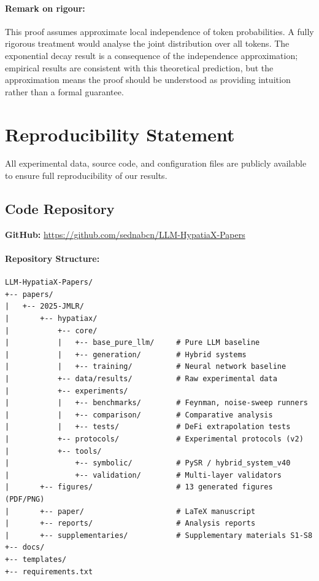 \documentclass[11pt,a4paper]{article}
\begin{document}
\paragraph{Remark on rigour:} This proof assumes approximate local independence of token probabilities. A fully rigorous treatment would analyse the joint distribution over all tokens. The exponential decay result is a consequence of the independence approximation; empirical results are consistent with this theoretical prediction, but the approximation means the proof should be understood as providing intuition rather than a formal guarantee\citep{kambhampati2024llms}.



\section{Reproducibility Statement}
\label{app:reproducibility}

All experimental data, source code, and configuration files are publicly
available to ensure full reproducibility of our results.

\subsection{Code Repository}

\textbf{GitHub:} \url{https://github.com/sednabcn/LLM-HypatiaX-Papers}

\paragraph{Repository Structure:}
\begin{small}
\begin{verbatim}
LLM-HypatiaX-Papers/
+-- papers/
|   +-- 2025-JMLR/
|       +-- hypatiax/
|           +-- core/
|           |   +-- base_pure_llm/     # Pure LLM baseline
|           |   +-- generation/        # Hybrid systems
|           |   +-- training/          # Neural network baseline
|           +-- data/results/          # Raw experimental data
|           +-- experiments/
|           |   +-- benchmarks/        # Feynman, noise-sweep runners
|           |   +-- comparison/        # Comparative analysis
|           |   +-- tests/             # DeFi extrapolation tests
|           +-- protocols/             # Experimental protocols (v2)
|           +-- tools/
|               +-- symbolic/          # PySR / hybrid_system_v40
|               +-- validation/        # Multi-layer validators
|       +-- figures/                   # 13 generated figures (PDF/PNG)
|       +-- paper/                     # LaTeX manuscript
|       +-- reports/                   # Analysis reports
|       +-- supplementaries/           # Supplementary materials S1-S8
+-- docs/
+-- templates/
+-- requirements.txt
\end{verbatim}
\end{small}
\end{document}
